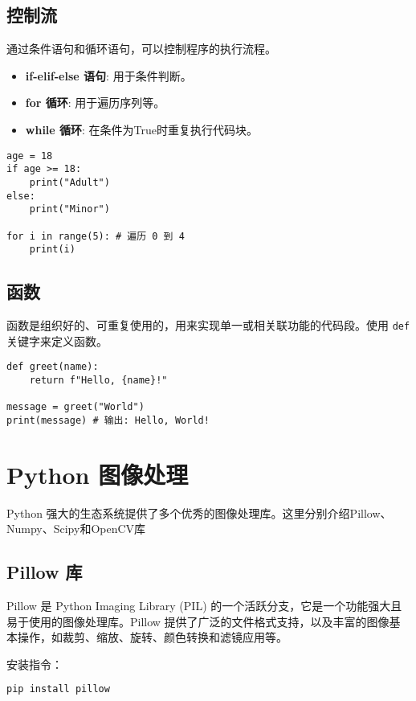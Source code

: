 \documentclass[UTF8]{gyh}
\begin{document}
\subsection{控制流}
通过条件语句和循环语句，可以控制程序的执行流程。
\begin{itemize}
    \item \textbf{if-elif-else 语句}: 用于条件判断。
    \item \textbf{for 循环}: 用于遍历序列等。
    \item \textbf{while 循环}: 在条件为True时重复执行代码块。
\end{itemize}

\begin{lstlisting}
age = 18
if age >= 18:
    print("Adult")
else:
    print("Minor")

for i in range(5): # 遍历 0 到 4
    print(i)
\end{lstlisting}

\subsection{函数}
函数是组织好的、可重复使用的，用来实现单一或相关联功能的代码段。使用 \texttt{def} 关键字来定义函数。

\begin{lstlisting}
def greet(name):
    return f"Hello, {name}!"

message = greet("World")
print(message) # 输出: Hello, World!
\end{lstlisting}

\section{Python 图像处理}
Python 强大的生态系统提供了多个优秀的图像处理库。这里分别介绍Pillow、Numpy、Scipy和OpenCV库


\subsection{Pillow 库}
Pillow 是 Python Imaging Library (PIL) 的一个活跃分支，它是一个功能强大且易于使用的图像处理库。Pillow 提供了广泛的文件格式支持，以及丰富的图像基本操作，如裁剪、缩放、旋转、颜色转换和滤镜应用等。

安装指令：
\begin{lstlisting}[language=bash]
pip install pillow
\end{lstlisting}
\end{document}
